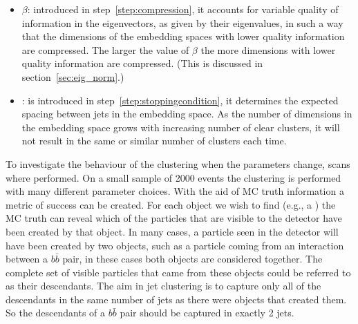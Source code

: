 \begin{itemize}
       \item  \(\beta\): introduced in step~\ref{step:compression}, it 
          accounts for variable quality of information in the eigenvectors, as given by their eigenvalues,
        in such a way that the dimensions of the embedding spaces with lower quality information are compressed.
        The larger the value of \(\beta\) the more dimensions with lower quality information are compressed.
        (This is discussed in section~\ref{sec:eig_norm}.)
    \item \stoppingdeltar{}: is introduced in step~\ref{step:stoppingcondition}, it
         determines the expected spacing between jets in the embedding space.
         As the number of dimensions in the embedding space grows with increasing 
         number of clear clusters, it will not result in the same or
         similar number of clusters each time.

\end{itemize}



To investigate the behaviour of the clustering when the parameters change, scans where performed.
On a small sample of 2000 events  the clustering is performed with many different parameter choices.
%
With the aid of MC truth information a metric of success can be created.
For each object we wish to find (e.g., a ) 
the MC truth can reveal which of the particles that are visible to the detector have
been created by that object.
In many cases, a particle seen in the detector will have been created by two objects,
such as a particle coming from an interaction between a \(b\bar{b}\) pair,
in these cases both objects are considered together.
The complete set of visible particles that came from these objects could be referred to as their descendants.
The aim in jet clustering is to capture only all of the descendants in the same number of jets as there were objects that created them.
So the descendants of a \(b\bar{b}\) pair should be captured in exactly 2 jets.

